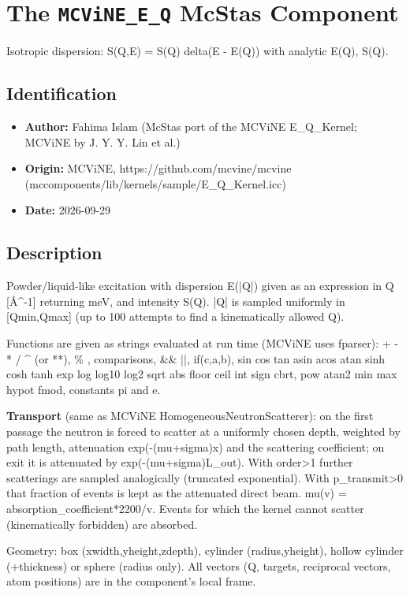\section{The \texttt{MCViNE\_E\_Q} McStas Component}
Isotropic dispersion: S(Q,E) = S(Q) delta(E - E(Q)) with analytic E(Q), S(Q).

\subsection*{Identification}
\begin{itemize}
  \item \textbf{Author:} Fahima Islam (McStas port of the MCViNE E\_Q\_Kernel; MCViNE by J. Y. Y. Lin et al.)
  \item \textbf{Origin:} MCViNE, https://github.com/mcvine/mcvine (mccomponents/lib/kernels/sample/E\_Q\_Kernel.icc)
  \item \textbf{Date:} 2026-09-29
\end{itemize}

\subsection*{Description}
Powder/liquid-like excitation with dispersion E(|Q|) given as an expression in Q [\AA{}\textasciicircum{}-1] returning meV, and intensity S(Q). |Q| is sampled uniformly in [Qmin,Qmax] (up to 100 attempts to find a kinematically allowed Q).

Functions are given as strings evaluated at run time (MCViNE uses fparser): + - * / \textasciicircum{} (or **), \% , comparisons, \&\& ||, if(c,a,b), sin cos tan asin acos atan sinh cosh tanh exp log log10 log2 sqrt abs floor ceil int sign cbrt, pow atan2 min max hypot fmod, constants pi and e.

\textbf{Transport} (same as MCViNE HomogeneousNeutronScatterer): on the first passage the neutron is forced to scatter at a uniformly chosen depth, weighted by path length, attenuation exp(-(mu+sigma)x) and the scattering coefficient; on exit it is attenuated by exp(-(mu+sigma)L\_out). With order\textgreater{}1 further scatterings are sampled analogically (truncated exponential). With p\_transmit\textgreater{}0 that fraction of events is kept as the attenuated direct beam. mu(v) = absorption\_coefficient*2200/v. Events for which the kernel cannot scatter (kinematically forbidden) are absorbed.

Geometry: box (xwidth,yheight,zdepth), cylinder (radius,yheight), hollow cylinder (+thickness) or sphere (radius only). All vectors (Q, targets, reciprocal vectors, atom positions) are in the component's local frame.

